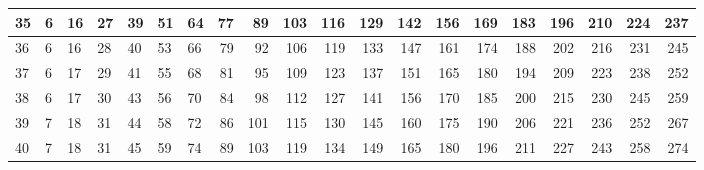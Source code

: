 \documentclass[
]{scrbook}
\begin{document}
\begin{tabular}{l|l|l|l|l|l|l|r|r|r|r|r|r|r|r|r|r|r|r|r}
\hline
35 & 6 & 16 & 27 & 39 & 51 & 64 & 77 & 89 & 103 & 116 & 129 & 142 & 156 & 169 & 183 & 196 & 210 & 224 & 237\\
\hline
36 & 6 & 16 & 28 & 40 & 53 & 66 & 79 & 92 & 106 & 119 & 133 & 147 & 161 & 174 & 188 & 202 & 216 & 231 & 245\\
\hline
37 & 6 & 17 & 29 & 41 & 55 & 68 & 81 & 95 & 109 & 123 & 137 & 151 & 165 & 180 & 194 & 209 & 223 & 238 & 252\\
\hline
38 & 6 & 17 & 30 & 43 & 56 & 70 & 84 & 98 & 112 & 127 & 141 & 156 & 170 & 185 & 200 & 215 & 230 & 245 & 259\\
\hline
39 & 7 & 18 & 31 & 44 & 58 & 72 & 86 & 101 & 115 & 130 & 145 & 160 & 175 & 190 & 206 & 221 & 236 & 252 & 267\\
\hline
40 & 7 & 18 & 31 & 45 & 59 & 74 & 89 & 103 & 119 & 134 & 149 & 165 & 180 & 196 & 211 & 227 & 243 & 258 & 274\\
\hline
\end{tabular}

  
\end{document}
